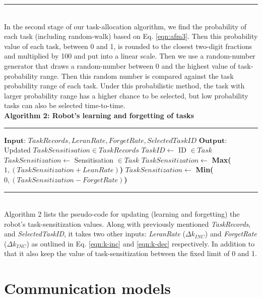 \documentclass[journal]{IEEEtran}
\newcommand{\HRule}{\rule{\linewidth}{0.3mm}}
\begin{document}
\vspace{-3mm} 
\HRule\\
In the second stage of our task-allocation algorithm, we  find the probability of each task (including random-walk) based on Eq. \ref{eqn:afm3}. Then this probability value of each task, between 0 and 1, is rounded to the closest two-digit fractions and multiplied by 100 and put into a linear scale. Then we use a random-number generator that draws a random-number between 0 and the highest value of task-probability range. Then this random number is compared against the task probability range of each task. Under this probabilistic method, the task with larger probability range has a  higher chance to be selected, but low probability tasks can also be selected time-to-time.\\

\textbf{Algorithm 2: Robot's learning and forgetting of tasks}
\vspace{-3mm}
\newline
\HRule
\begin{algorithmic}[1]
\begin{small}
\label{alg:update-sz}
\State $\textbf{Input: }  TaskRecords, LeranRate, ForgetRate, SelectedTaskID$
\State $\textbf{Output: }$ Updated $TaskSensitisation \in TaskRecords$
\State $ TaskID \gets  $ ID $\in Task$
\State $ TaskSensitization \gets  $   Sensitisation $ \in Task$
\State $ TaskSensitization \gets $ \textbf{Max(}$1, (TaskSensitization + LeanRate)$\textbf{)}
\Else
\State $ TaskSensitization \gets $ \textbf{Min(}$0, (TaskSensitization - ForgetRate)$\textbf{)}
\EndIf
\EndFor
\end{small}
\end{algorithmic}
\vspace{-3mm} 
\HRule\\

Algorithm 2 lists the pseudo-code for updating (learning and forgetting) the robot's task-sensitization values. Along with previously mentioned \textit{TaskRecords}, and  \textit{SelectedTaskID}, it takes two other inputs: \textit{LeranRate} ($\Delta k_{INC} $) and \textit{ForgetRate} ($\Delta k_{INC} $) as outlined in Eq. \ref{eqn:k-inc} and \ref{eqn:k-dec} respectively.  In addition to that it also keep the value of task-sensitization between the fixed limit of 0 and 1.
\section{Communication models}
\label{sec:comm-model}
\end{document}
